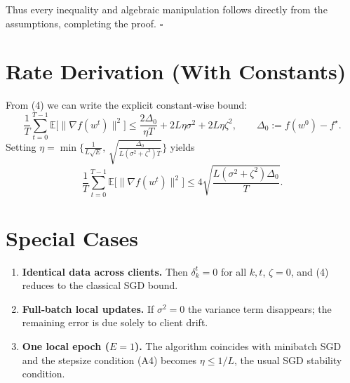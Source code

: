 \documentclass{article}
\begin{document}
Thus every inequality and algebraic manipulation follows directly from the assumptions, completing the proof. \(\square\)

\section*{Rate Derivation (With Constants)}
From (4) we can write the explicit constant‑wise bound:
\[
\frac1T\sum_{t=0}^{T-1}\mathbb{E}\!\big[\|\nabla f(w^{t})\|^{2}\big]
\le
\frac{2\Delta_{0}}{\eta T}
+2L\eta\sigma^{2}
+2L\eta\zeta^{2},
\qquad 
\Delta_{0}:=f(w^{0})-f^{\star}.
\]
Setting \(\eta = \min\big\{\frac{1}{L\sqrt{E}},\,\sqrt{\frac{\Delta_{0}}{L(\sigma^{2}+\zeta^{2})T}}\big\}\) yields
\[
\frac1T\sum_{t=0}^{T-1}\mathbb{E}\!\big[\|\nabla f(w^{t})\|^{2}\big]
\le
4\sqrt{\frac{L(\sigma^{2}+\zeta^{2})\Delta_{0}}{T}} .
\]

\section*{Special Cases}
\begin{enumerate}[label=\alph*)]
\item \textbf{Identical data across clients.} Then \(\delta_{k}^{t}=0\) for all \(k,t\), \(\zeta=0\), and (4) reduces to the classical SGD bound.
\item \textbf{Full‑batch local updates.} If \(\sigma^{2}=0\) the variance term disappears; the remaining error is due solely to client drift.
\item \textbf{One local epoch (\(E=1\)).} The algorithm coincides with minibatch SGD and the stepsize condition (A4) becomes \(\eta\le 1/L\), the usual SGD stability condition.
\end{enumerate}
\end{document}
